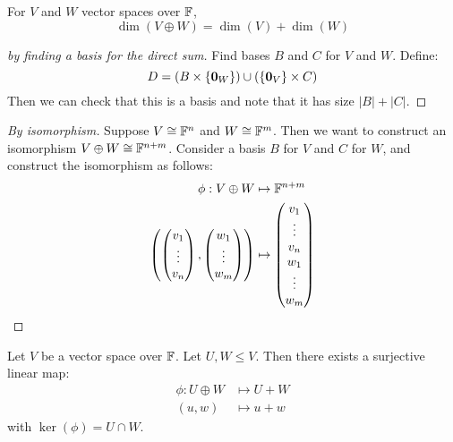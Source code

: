 \documentclass[../Main.tex]{subfiles}
\begin{document}
\begin{lemma}
    For $V$ and $W$ vector spaces over $\mathbb{F}$,
    \begin{equation}
        \dim(V \oplus W) = \dim(V) + \dim(W)
        \label{eqnDSDim}
    \end{equation}
    \label{lemDSDim}
\end{lemma}
\begin{proof}[by finding a basis for the direct sum]
    Find bases $B$ and $C$ for $V$ and $W$. Define:
    \begin{equation*}
        D = (B \times \{\boldsymbol{0}_W\}) \cup (\{\boldsymbol{0}_V\} \times C)
    \end{equation*}
    Then we can check that this is a basis and note that it has size $|B| + |C|$.
\end{proof}
\begin{proof}[By isomorphism]
    Suppose $V \cong \mathbb{F}^n$ and $W \cong \mathbb{F}^m$. Then we want to construct an isomorphism $V \oplus W \cong \mathbb{F}^{n+m}$. Consider a basis $B$ for $V$ and $C$ for $W$, and construct the isomorphism as follows:
    \begin{align*}
        \phi : V \oplus W &\mapsto \mathbb{F}^{n+m}\\
        \left(\begin{pmatrix} v_1 \\ \vdots \\ v_n\end{pmatrix}, \begin{pmatrix} w_1 \\ \vdots \\ w_m\end{pmatrix}\right) &\mapsto \begin{pmatrix} v_1 \\ \vdots \\ v_n \\ w_1 \\ \vdots \\ w_m\end{pmatrix}
    \end{align*}
\end{proof}
\begin{proposition}
    Let $V$ be a vector space over $\mathbb{F}$. Let $U, W \leq V$. Then there exists a surjective linear map:
    \begin{align*}
        \phi : U \oplus W &\mapsto U + W\\
        (u, w) &\mapsto u + w
    \end{align*}
    with $\ker(\phi) = U \cap W$.
    \label{propMapDSToSum}
\end{proposition}
\end{document}
